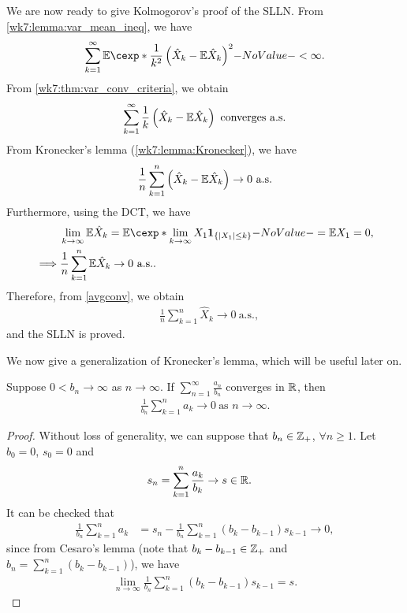 \documentclass[12pt]{article}
\begin{document}
We are now ready to give Kolmogorov's proof of the SLLN. From \cref{wk7:lemma:var_mean_ineq}, we have
\begin{align*}
\sum_{k = 1}^{\infty} \E[\frac{1}{k^2} \left(\hat{X}_k - \E \hat{X}_k  \right)^2] < \infty.
\end{align*}
From \cref{wk7:thm:var_conv_criteria}, we obtain
\begin{align*}
\sum_{k = 1}^{\infty} \frac{1}{k} \left(\hat{X}_k - \E \hat{X}_k  \right) \text{ converges a.s.}
\end{align*}
From Kronecker's lemma (\cref{wk7:lemma:Kronecker}), we have
\begin{align}\label{avgconv}
\frac{1}{n} \sum_{k = 1}^{n} \left(\hat{X}_k - \E \hat{X}_k  \right) \to 0 \ \text{a.s.}
\end{align}
Furthermore, using the DCT, we have
\begin{align}
&\lim_{k \to \infty} \E \hat{X}_k = \E[\lim_{k \to \infty} X_1 \indicatore{\{|X_1| \leq k\}}] = \E X_1 = 0, \\
\implies
&\frac{1}{n} \sum_{k = 1}^{n} \E \hat{X}_k \to 0 \ \text{a.s.}. \label{hatXExp}
\end{align}
Therefore, from \cref{avgconv}, we obtain 
\begin{align*}
&\frac{1}{n} \sum_{k = 1}^{n} \hat{X}_k \to 0 \ \text{a.s.},
\end{align*}
and the SLLN is proved.

We now give a generalization of Kronecker's lemma, which will be useful later on.
\begin{Lemma}\label{wk7:Generalized_Kronecker}
Suppose $0< b_n \to \infty$ as $n\to\infty$. If $\displaystyle\sum_{n=1}^{\infty} \frac{a_n}{b_n}$ converges in $\mathbb{R}$, then
\begin{align*}
\frac{1}{b_n} \sum_{k=1}^n a_k \to 0 \ \text{as $n \to \infty$}.
\end{align*}
\end{Lemma}
%
\begin{proof}
Without loss of generality, we can suppose that $b_n \in \mathbb{Z}_+$, $\forall n\geq1$. Let $b_0 = 0$, $s_0 = 0$ and
\begin{align*}
s_n &= \sum_{k=1}^n \frac{a_k}{b_k} \to s \in \mathbb{R}.
\end{align*}
It can be checked that
\begin{align*}
\frac{1}{b_n} \sum_{k=1}^n a_k 
&= s_n - \frac{1}{b_n} \sum_{k=1}^n (b_k - b_{k-1}) s_{k-1} \to 0,
\end{align*}
since from Cesaro's lemma (note that $b_k - b_{k-1} \in \mathbb{Z}_+$ and $b_n=\sum_{k=1}^n (b_k - b_{k-1})$), we have
\begin{align*}
\lim_{n \to \infty} \frac{1}{b_n} \sum_{k=1}^n (b_k - b_{k-1}) s_{k-1} = s.
\end{align*}
\end{proof}
\end{document}
